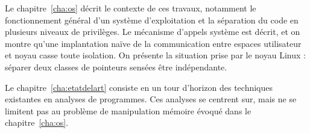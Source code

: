 \begin{headingpage}

Le chapitre~\ref{cha:os} décrit le contexte de ces travaux, notamment le
fonctionnement général d'un système d'exploitation et la séparation du code en
plusieurs niveaux de privilèges. Le mécanisme d'appels système est décrit, et on
montre qu'une implantation naïve de la communication entre espaces utilisateur
et noyau casse toute isolation. On présente la situation prise par le noyau
Linux : séparer deux classes de pointeurs sensées être indépendante.

Le chapitre~\ref{cha:etatdelart} consiste en un tour d'horizon des techniques
existantes en analyses de programmes. Ces analyses se centrent sur, mais ne se
limitent pas au problème de manipulation mémoire évoqué dans le
chapitre~\ref{cha:os}.

\end{headingpage}

